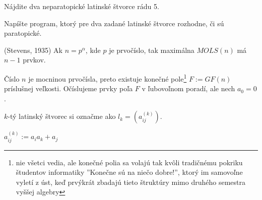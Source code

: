 \begin{exercise}
Nájdite dva neparatopické latinské štvorce rádu 5.
\end{exercise}

\begin{exercise}
Napíšte program, ktorý pre dva zadané latinské štvorce rozhodne, či sú paratopické.
\end{exercise}


\begin{theorem}{(Stevens, 1935)}
\label{thm:stevens}
Ak $n = p^\alpha$, kde $p$ je prvočíslo, tak maximálna $MOLS(n)$ má $n-1$ prvkov.
\end{theorem}

\begin{construction}
Číslo $n$ je mocninou prvočísla, preto existuje konečné pole\footnote{nie všetci vedia, ale konečné polia sa volajú tak kvôli tradičnému pokriku študentov informatiky ''Konečne sú na niečo dobre!'', ktorý im samovoľne vyletí z úst, keď prvýkrát zbadajú tieto štruktúry mimo druhého semestra vyššej algebry} $F := GF(n)$ príslušnej veľkosti. 
Očíslujeme prvky poľa $F$ v ľubovoľnom poradí, ale nech $a_0 = 0$.

$k$-tý latinský štvorec si označme ako $l_k = \left(a_{ij}^{(k)}\right)$.

$a_{ij}^{(k)} := a_i a_k + a_j$
\end{construction}


